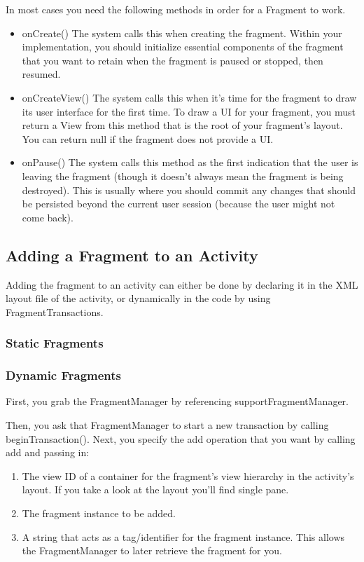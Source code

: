 In most cases you need the following methods in order for a Fragment to work.

\begin{itemize}
	\item onCreate()
	The system calls this when creating the fragment. Within your implementation, you should initialize essential components of the fragment that you want to retain when the fragment is paused or stopped, then resumed.
	\item onCreateView()
	The system calls this when it's time for the fragment to draw its user interface for the first time. To draw a UI for your fragment, you must return a View from this method that is the root of your fragment's layout. You can return null if the fragment does not provide a UI.
	\item onPause()
	The system calls this method as the first indication that the user is leaving the fragment (though it doesn't always mean the fragment is being destroyed). This is usually where you should commit any changes that should be persisted beyond the current user session (because the user might not come back).
\end{itemize}

\subsection{Adding a Fragment to an Activity}

Adding the fragment to an activity can either be done by declaring it in the XML layout file of the activity, or dynamically in the code by using FragmentTransactions.
\subsubsection{Static Fragments}

\subsubsection{Dynamic Fragments}
First, you grab the FragmentManager by referencing supportFragmentManager.

Then, you ask that FragmentManager to start a new transaction by calling beginTransaction(). Next, you specify the add operation that you want by calling add and passing in:

\begin{enumerate}
\item The view ID of a container for the fragment’s view hierarchy in the activity’s layout. If you take a look at the layout you'll find single pane.
\item The fragment instance to be added.
\item A string that acts as a tag/identifier for the fragment instance. This allows the FragmentManager to later retrieve the fragment for you.
\end{enumerate}

